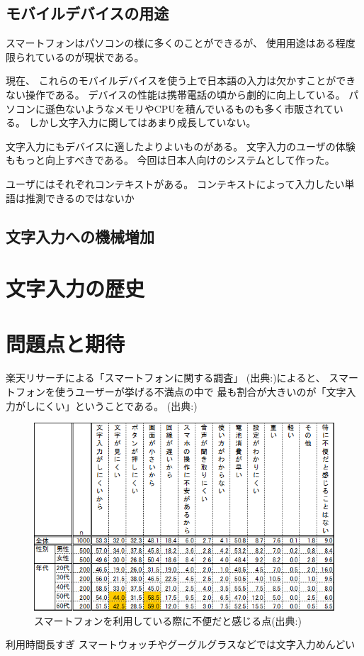 \subsection{モバイルデバイスの用途}

スマートフォンはパソコンの様に多くのことができるが、
使用用途はある程度限られているのが現状である。


現在、
これらのモバイルデバイスを使う上で日本語の入力は欠かすことができない操作である。
デバイスの性能は携帯電話の頃から劇的に向上している。
パソコンに遜色ないようなメモリやCPUを積んでいるものも多く市販されている。
しかし文字入力に関してはあまり成長していない。

文字入力にもデバイスに適したよりよいものがある。
文字入力のユーザの体験ももっと向上すべきである。
今回は日本人向けのシステムとして作った。

ユーザにはそれぞれコンテキストがある。
コンテキストによって入力したい単語は推測できるのではないか

\subsection{文字入力への機械増加}


\section{文字入力の歴史}


\section{問題点と期待}
楽天リサーチによる「スマートフォンに関する調査」
(出典:\cite{rakutensmartphone})によると、
スマートフォンを使うユーザーが挙げる不満点の中で
最も割合が大きいのが「文字入力がしにくい」ということである。
(出典:\cite{rakutensmartphone})
\begin{figure}
  \begin{center}
    \includegraphics[width=140mm,bb=0 0 589 368]{images/dissatisfaction.png}
    \caption{スマートフォンを利用している際に不便だと感じる点(出典:\cite{rakutensmartphone})}
    \label{fig:dissatisfaction}
  \end{center}
\end{figure}

利用時間長すぎ
スマートウォッチやグーグルグラスなどでは文字入力めんどい
